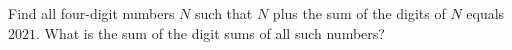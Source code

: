 Find all four-digit numbers $N$ such that $N$ plus the sum of the digits of $N$ equals $2021$. What is the sum of the digit sums of all such numbers?
